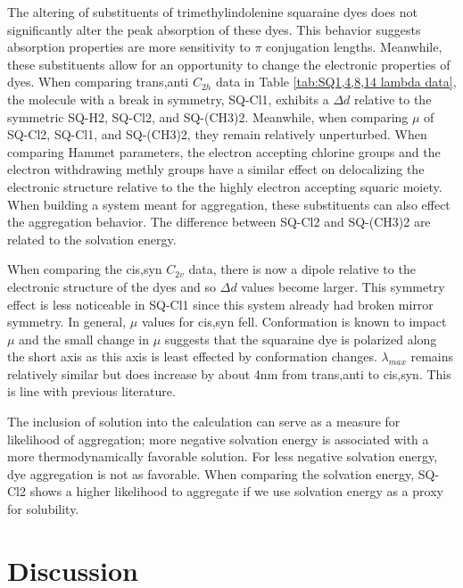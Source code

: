 \documentclass[journal=jacsat,manuscript=article]{achemso}
\begin{document}
\newpage
The altering of substituents of trimethylindolenine squaraine dyes does not significantly alter the peak absorption of these dyes. This behavior suggests absorption properties are more sensitivity to $\pi$ conjugation lengths\cite{Yamaguchi2008HowEfficiency}. Meanwhile, these substituents allow for an opportunity to change the electronic properties of dyes. When comparing trans,anti $C_{2h}$ data in Table \ref{tab:SQ1,4,8,14 lambda data}, the molecule with a break in symmetry, SQ-Cl1, exhibits a $\Delta d$ relative to the symmetric SQ-H2, SQ-Cl2, and SQ-(CH3)2. Meanwhile, when comparing $\mu$ of SQ-Cl2, SQ-Cl1, and SQ-(CH3)2, they remain relatively unperturbed. When comparing Hammet parameters, the electron accepting chlorine groups and the electron withdrawing methly groups have a similar effect on delocalizing the electronic structure relative to the the highly electron accepting squaric moiety.
When building a system meant for aggregation, these substituents can also effect the aggregation behavior. The difference between SQ-Cl2 and SQ-(CH3)2 are related to the solvation energy.

When comparing the cis,syn $C_{2v}$ data, there is now a dipole relative to the electronic structure of the dyes and so $\Delta d$ values become larger. This symmetry effect is less noticeable in SQ-Cl1 since this system already had broken mirror symmetry. In general, $\mu$ values for cis,syn fell. Conformation is known to impact $\mu$\cite{Brand2011HowStructure} and the small change in $\mu$ suggests that the squaraine dye is polarized along the short axis as this axis is least effected by conformation changes\cite{Lopata2011Excited-stateTD-ZINDO}. $\lambda_{max}$ remains relatively similar but does increase by about 4nm from trans,anti to cis,syn. This is line with previous literature\cite{Borrelli2014TheoreticalDye}.

The inclusion of solution into the calculation can serve as a measure for likelihood of aggregation; more negative solvation energy is associated with a more thermodynamically favorable solution. For less negative solvation energy, dye aggregation is not as favorable. When comparing the solvation energy, SQ-Cl2 shows a higher likelihood to aggregate if we use solvation energy as a proxy for solubility\cite{Fothergill2018AbDyes}. 
\newpage
\newpage
\section{Discussion}
\end{document}
